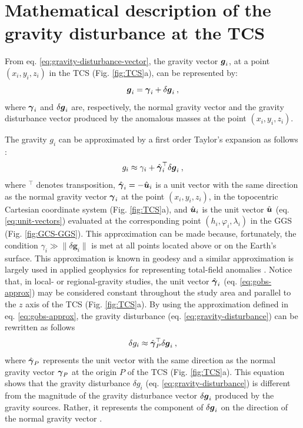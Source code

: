 \documentclass[extra]{gji}
\begin{document}
\section{Mathematical description of the gravity disturbance at the TCS}

From eq. \ref{eq:gravity-disturbance-vector}, the gravity vector $\mitbf{g}_{i}$, at a point 
$(x_{i}, y_{i}, z_{i})$ in the TCS (Fig. \ref{fig:TCS}a), can be represented by:
\begin{equation}
\mitbf{g}_{i} = \mitbf{\gamma}_{i} + \delta \mitbf{g}_{i} \: ,
\label{eq:gravity-vector-TCS}
\end{equation}
where $\mitbf{\gamma}_{i}$ and $\delta \mitbf{g}_{i}$
are, respectively, the normal gravity vector and the 
gravity disturbance vector produced by the anomalous 
masses at the point $(x_{i}, y_{i}, z_{i})$.

The gravity $g_{i}$ can be approximated by a first order Taylor's 
expansion as follows \citep{sanso_sideris2013}:
\begin{equation}
g_{i} \approx \gamma_{i} + 
\hat{\mitbf{\gamma}}_{i}^{\top} \delta \mitbf{g}_{i} \: ,
\label{eq:gobs-approx}
\end{equation}
where $^{\top}$ denotes transposition,
$\hat{\mitbf{\gamma}}_{i} = -\hat{\mitbf{u}}_{i}$ is a unit 
vector with the same direction as the normal gravity vector 
$\mitbf{\gamma}_{i}$ at the point $(x_{i}, y_{i}, z_{i})$, in the
topocentric Cartesian coordinate system (Fig. \ref{fig:TCS}a), and
$\hat{\mitbf{u}}_{i}$ is the unit vector $\hat{\mitbf{u}}$ 
(eq. \ref{eq:unit-vectors}) evaluated at the corresponding 
point $(h_{i}, \varphi_{i}, \lambda_{i})$ in the 
GGS (Fig. \ref{fig:GCS-GGS}).
This approximation can be made because, fortunately, 
the condition $\gamma_{i} \gg \| \delta \mathbf{g}_{i} \|$ 
is met at all points located above or on the Earth's surface.
This approximation is known in geodesy \citep[e.g.,][]{sanso_sideris2013}
and a similar approximation is largely used in applied geophysics 
for representing total-field anomalies \citep[e.g.,][]{blakely1996}.
Notice that, in local- or regional-gravity studies, the unit
vector $\hat{\mitbf{\gamma}}_{i}$ (eq. \ref{eq:gobs-approx}) 
may be considered constant throughout the study area and 
parallel to the $z$ axis of the TCS (Fig. \ref{fig:TCS}a).
By using the approximation defined in eq. 
\ref{eq:gobs-approx}, the gravity disturbance 
(eq. \ref{eq:gravity-disturbance}) can be rewritten as 
follows 
\begin{equation}
\delta g_{i} \approx \hat{\mitbf{\gamma}}_{P}^{\top} \delta \mitbf{g}_{i} \: ,
\label{eq:gravity-disturbance-approx-TCS}
\end{equation}
where $\hat{\mitbf{\gamma}}_{P}$ represents the unit vector with
the same direction as the normal gravity vector $\mitbf{\gamma}_{P}$
at the origin $P$ of the TCS (Fig. \ref{fig:TCS}a).
This equation shows that the gravity disturbance $\delta g_{i}$ (eq. \ref{eq:gravity-disturbance}) is different from the magnitude
of the gravity disturbance vector $\delta \mitbf{g}_{i}$
produced by the gravity sources. Rather, it represents the 
component of $\delta \mitbf{g}_{i}$ on the direction of the normal
gravity vector \citep{hofmann-wellenhof-moritz2005, sanso_sideris2013}. 
\end{document}
